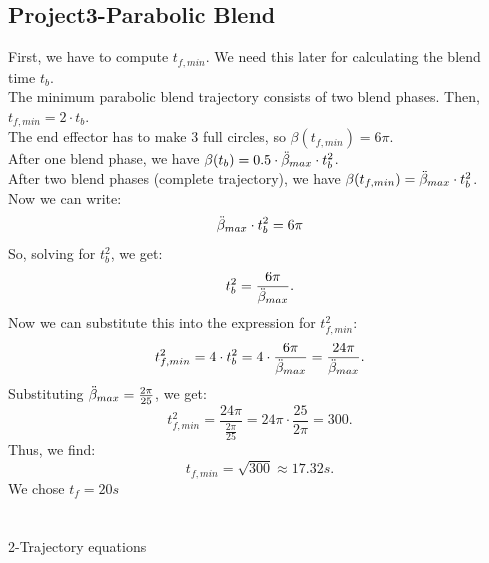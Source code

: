 \subsection{Project3-Parabolic Blend} 

First, we have to compute \( t_{f,min} \). We need this later for calculating the blend time \( t_b \). \\
The minimum parabolic blend trajectory consists of two blend phases. Then, \( t_{f,min} = 2 \cdot t_b \). \\
The end effector has to make 3 full circles, so \( \beta(t_{f,min}) = 6 \pi \). \\
After one blend phase, we have \( \beta(t_b) = 0.5 \cdot \Ddot{\beta}_{max} \cdot t_b^2 \). \\
After two blend phases (complete trajectory), we have \( \beta(t_{f,min}) = \Ddot{\beta}_{max} \cdot t_b^2 \). \\
Now we can write:
\[
\Ddot{\beta}_{max} \cdot t_b^2 = 6 \pi
\]
So, solving for \( t_b^2 \), we get:
\[
t_b^2 = \frac{6 \pi}{\Ddot{\beta}_{max}}.
\]
Now we can substitute this into the expression for \( t_{f,min}^2 \):
\[
t_{f,min}^2 = 4 \cdot t_b^2 = 4 \cdot \frac{6 \pi}{\Ddot{\beta}_{max}} = \frac{24 \pi}{\Ddot{\beta}_{max}}.
\]
Substituting \( \Ddot{\beta}_{max} = \frac{2 \pi}{25} \), we get:
\[
t_{f,min}^2 = \frac{24 \pi}{\frac{2 \pi}{25}} = 24 \pi \cdot \frac{25}{2 \pi} = 300.
\]
Thus, we find:
\[
t_{f,min} = \sqrt{300} \approx 17.32 s.
\]
We chose $t_{f}= 20s$ \\\\\\
2-Trajectory equations \\ \\

